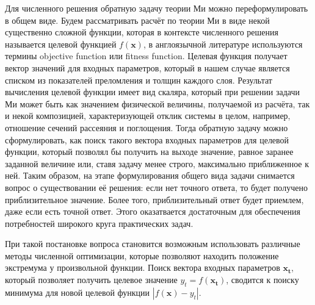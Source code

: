 Для численного решения обратную задачу теории Ми можно
переформулировать в общем виде. Будем рассматривать расчёт по теории
Ми в виде некой существенно сложной функции, которая в контексте
численного решения называется целевой функцией $f(\mathbf{x})$, в
англоязычной литературе используются термины objective function или
fitness function.  Целевая функция получает вектор значений для
входных параметров, который в нашем случае является списком из
показателей преломления и толщин каждого слоя. Результат вычисления
целевой функции имеет вид скаляра, который при решении задачи Ми может
быть как значением физической величины, получаемой из расчёта, так и
некой композицией, характеризующей отклик системы в целом, например,
отношение сечений рассеяния и поглощения. Тогда обратную задачу можно
сформулировать, как поиск такого вектора входных параметров для
целевой функции, который позволял бы получить на выходе значение,
равное заранее заданной величине или, ставя задачу менее строго,
максимально приближенное к ней. Таким образом, на этапе формулирования
общего вида задачи снимается вопрос о существовании её решения: если
нет точного ответа, то будет получено приблизительное значение. Более
того, приблизительный ответ будет приемлем, даже если есть точной
ответ.  Этого оказатвается достаточным для обеспечения потребностей
широкого круга практических задач.

При такой постановке вопроса становится возможным использовать
различные методы численной оптимизации, которые позволяют находить
положение экстремума у произвольной функции. Поиск вектора входных
параметров $\mathbf{x_t}$, который позволяет получить целевое значение
$y_t=f(\mathbf{x_t})$, сводится к поиску минимума для новой целевой
функции $\left|f(\mathbf{x})-y_t\right|$.

